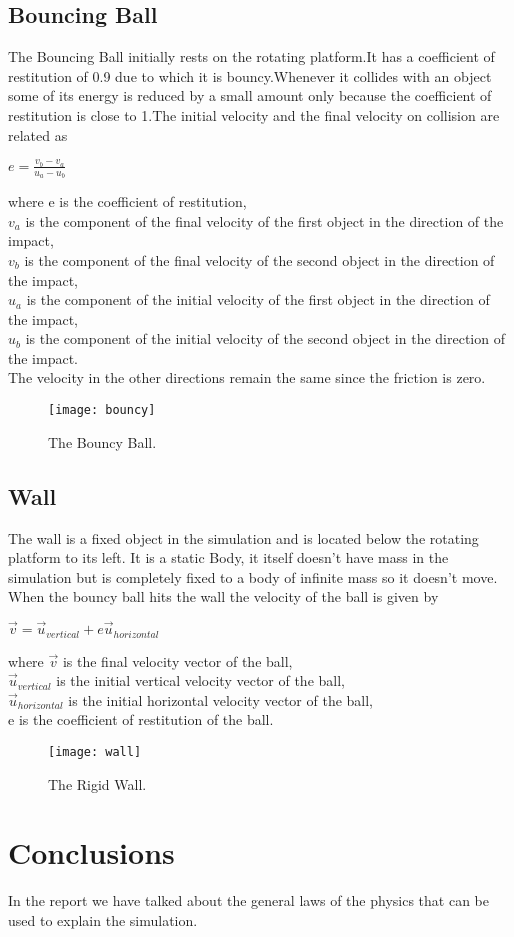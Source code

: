 \documentclass{article}
\begin{document}
\subsection{Bouncing Ball}
The Bouncing Ball initially rests on the rotating platform.It has a coefficient of restitution\cite{wikie} of 0.9 due to which it is bouncy.Whenever it collides with an object some of its energy is reduced by a small amount only because the coefficient of restitution is close to 1.The initial velocity and the final velocity on collision are related as
\begin{center}
$ e=\frac{v_b -v_a}{u_a-u_b}$
\end{center}
\cite{resnick,univ,wikie}
where e is the coefficient of restitution,\\
\indent $v_a$ is the component of the final velocity of the first object in the direction of the impact,\\
\indent	$v_b$ is the component of the final velocity of the second object in the direction of the impact,\\
\indent	$u_a$ is the component of the initial velocity of the first object in the direction of the impact,\\
\indent	$u_b$ is the component of the initial velocity of the second object in the direction of the impact.\\
The velocity in the other directions remain the same since the friction is zero.
\begin{figure}[h!] 
\centering 
\texttt{[image: bouncy]} 
\caption{The Bouncy Ball.} 
\end{figure}
\subsection{Wall}
The wall is a fixed object in the simulation and is located below the rotating platform to its left. It is a static Body, it itself doesn't have mass in the simulation but is completely fixed to a body of infinite mass so it doesn't move. When the bouncy ball hits the wall the velocity of the ball is given by
\begin{center}
$ \vec{v} =\vec{u}_{vertical} + e\vec{u}_{horizontal} $
\end{center}
\cite{resnick,univ,wikie}where $\vec{v}$ is the final velocity vector of the ball,\\
\indent $\vec{u}_{vertical}$ is the initial vertical velocity vector of the ball,\\
\indent $\vec{u}_{horizontal}$ is the initial horizontal velocity vector of the ball,\\
\indent e is the coefficient of restitution of the ball.\\
\begin{figure}[h!] 
\centering 
\texttt{[image: wall]} 
\caption{The Rigid Wall.} 
\end{figure}
\section{Conclusions}
\indent In the report we have talked about the general laws of the physics that can be used to explain the simulation.


\end{document}
